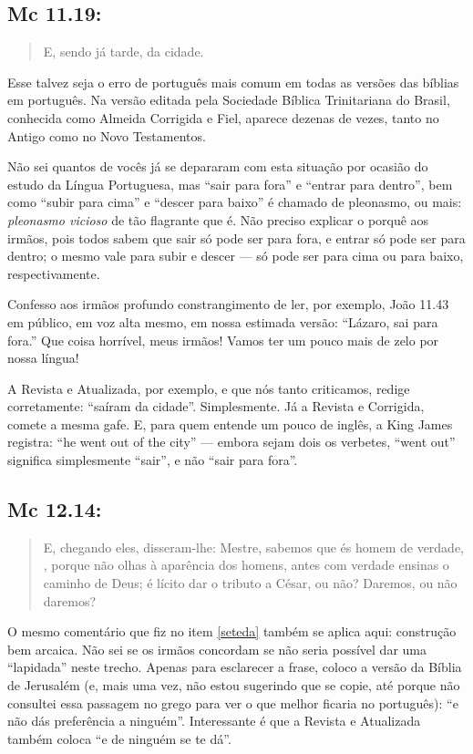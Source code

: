 \subsection*{Mc 11.19:}\label{saiu}
\begin{quote}
    \small
E, sendo já tarde,  da cidade.
\end{quote}

Esse talvez seja o erro de português mais comum em todas as versões das bíblias em português. Na versão editada pela Sociedade Bíblica Trinitariana do Brasil, conhecida como Almeida Corrigida e Fiel, aparece dezenas de vezes, tanto no Antigo como no Novo Testamentos.

Não sei quantos de vocês já se depararam com esta situação por ocasião
do estudo da Língua Portuguesa, mas ``sair para fora'' e ``entrar para
dentro'', bem como ``subir para cima'' e ``descer para baixo'' é
chamado de pleonasmo, ou mais: \emph{pleonasmo vicioso} de tão flagrante que
é. Não preciso explicar o porquê aos irmãos, pois todos sabem que sair
só pode ser para fora, e entrar só pode ser para dentro; o mesmo vale
para subir e descer --- só pode ser para cima ou para baixo,
respectivamente.

Confesso aos irmãos profundo constrangimento de ler, por exemplo,
João 11.43 em público, em voz alta mesmo, em nossa estimada versão:
``Lázaro, sai para fora.'' Que coisa horrível, meus irmãos! Vamos ter
um pouco mais de zelo por nossa língua!

A Revista e Atualizada, por exemplo, e que nós tanto criticamos,
redige corretamente: ``saíram da cidade''. Simplesmente. Já a Revista
e Corrigida, comete a mesma gafe. E, para quem entende um pouco de
inglês, a King James registra: ``he went out of the city'' --- embora
sejam dois os verbetes, ``went out'' significa simplesmente ``sair'',
e não ``sair para fora''.

\subsection*{Mc 12.14:}
\begin{quote}
    \small
E, chegando eles, disseram-lhe:
 Mestre, sabemos que és homem de verdade, , porque não olhas à aparência dos homens, antes com verdade
 ensinas o caminho de Deus; é lícito dar o tributo a César, ou não?
 Daremos, ou não daremos?
\end{quote}

O mesmo comentário que fiz no item \ref{seteda}  também se aplica aqui:
construção bem arcaica. Não sei se os irmãos concordam se não seria
possível dar uma ``lapidada'' neste trecho. Apenas para esclarecer a
frase, coloco a versão da Bíblia de Jerusalém (e, mais uma vez, não
estou sugerindo que se copie, até porque não consultei essa passagem
no grego para ver o que melhor ficaria no português): ``e não dás
preferência a ninguém''. Interessante é que a Revista e Atualizada também coloca ``e de ninguém se te dá''.


